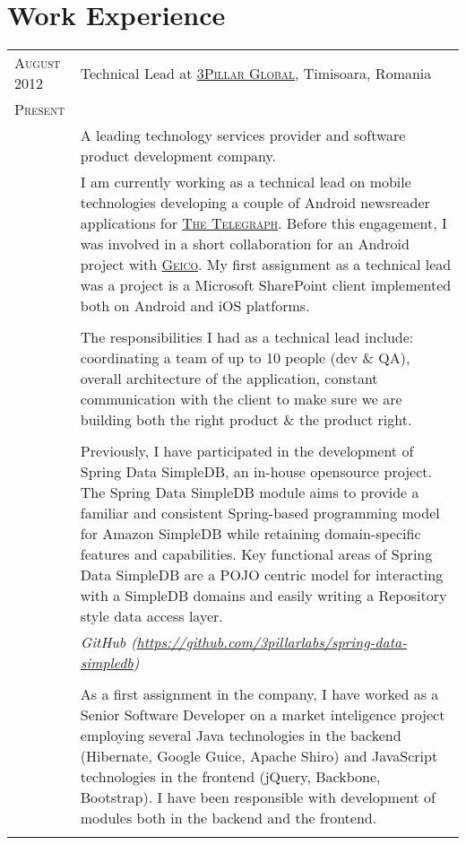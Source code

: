 \documentclass[a4paper,10pt]{article}
\begin{document}
\section{Work Experience}
\begin{longtable}{p{2.5cm}|p{11cm}}

 \raggedleft \textsc{August 2012} & Technical Lead at
 \textsc{\href{http://www.3pillarglobal.com/}{3Pillar Global}}, Timisoara, Romania
 \\\raggedleft \textsc{Present}\\& 
 \footnotesize{A leading technology services provider and software product development company.}\\
& \footnotesize{I am currently working as a technical lead on mobile technologies developing a couple of Android newsreader applications for \textsc{\href{http://www.telegraph.co.uk/}{The Telegraph}}. Before this engagement, I was involved in a short collaboration for an Android project with \textsc{\href{https://www.geico.com/}{Geico}}. My first assignment as a technical lead was a project is a Microsoft SharePoint client implemented both on Android and iOS platforms.} \\ \\
& \footnotesize{The responsibilities I had as a technical lead include: coordinating a team of up to 10 people (dev \& QA), overall architecture of the application, constant communication with the client to make sure we are building both the right product \& the product right.} \\ \\
& \footnotesize{Previously, I have participated in the development of Spring Data SimpleDB, an in-house opensource project. The Spring Data SimpleDB module aims to provide a familiar and consistent Spring-based programming model for Amazon SimpleDB while retaining domain-specific features and capabilities. Key functional areas of Spring Data SimpleDB are a POJO centric model for interacting with a SimpleDB domains and easily writing a Repository style data access layer.} \\
& \footnotesize{\emph{GitHub (\url{https://github.com/3pillarlabs/spring-data-simpledb})}} \\ \\
& \footnotesize{As a first assignment in the company, I have worked as a Senior Software Developer on a market inteligence project employing several Java technologies in the backend (Hibernate, Google Guice, Apache Shiro) and JavaScript technologies in the
frontend (jQuery, Backbone, Bootstrap). I have been responsible with development of modules both in the backend and the frontend.}\\
\multicolumn{2}{c}{} \\ 


\end{longtable}
\end{document}
